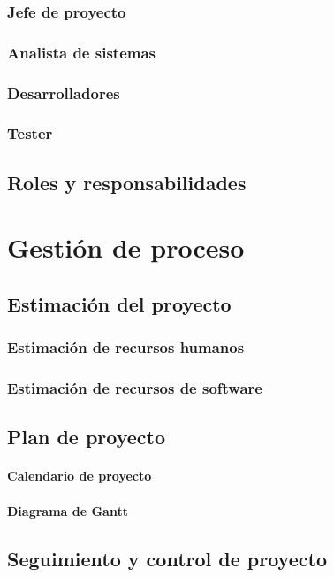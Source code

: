\subsection{Jefe de proyecto}
\subsection{Analista de sistemas}
\subsection{Desarrolladores}
\subsection{Tester}
\section{Roles y responsabilidades}
\begin{table}
\end{table}
\chapter*{Gestión de proceso}
\section{Estimación del proyecto}
\subsection{Estimación de recursos humanos}
\subsection{Estimación de recursos de software}
\section{Plan de proyecto}
\subsubsection{Calendario de proyecto}
\subsubsection{Diagrama de Gantt}

\section{Seguimiento y control de proyecto}

